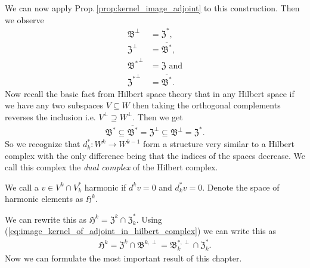 \documentclass[../master_thesis.tex]{subfiles}
\begin{document}
We can now apply Prop.\,\ref{prop:kernel_image_adjoint} to this construction. 
Then we observe 
\begin{align*}
    \mathfrak{B}^\perp &= \mathfrak{Z}^*,
    \\ \mathfrak{Z}^\perp &= \overline{\mathfrak{B}^*},
    \\ \mathfrak{B^*}^\perp &= \mathfrak{Z} \text{ and}
    \\ \mathfrak{Z^*}^\perp &= \overline{\mathfrak{B}^*}.
\end{align*}
Now recall the basic fact from Hilbert space theory that 
in any Hilbert space if we have any two subspaces $V \subseteq W$ then taking the 
orthogonal complements reverses the inclusion i.e.
$V^\perp \supseteq W^\perp$. Then we get 
\begin{align}
    \mathfrak{B}^* \subseteq \overline{\mathfrak{B}^*} 
    = \mathfrak{Z}^\perp  \subseteq \mathfrak{B}^\perp 
    = \mathfrak{Z}^*. \label{eq:image_kernel_of_adjoint_in_hilbert_complex}
\end{align}
So we recognize that $d_k^*:W^k \rightarrow W^{k-1}$ form a structure 
very similar to a Hilbert complex with the only difference being that 
the indices of the spaces decrease. We call this complex the 
\textit{dual complex} of the Hilbert complex.

\begin{definition}
    We call a $v \in V^k \cap V^*_k$ harmonic if $d^k v = 0$ and 
    $d^*_k v = 0$. Denote the space of harmonic elements as 
    $\mathfrak{H}^k$.
\end{definition}
\noindent We can rewrite this as $\mathfrak{H}^k = \mathfrak{Z}^k 
\cap \mathfrak{Z}^*_k$. Using 
(\ref{eq:image_kernel_of_adjoint_in_hilbert_complex}) we can write this as
\begin{align*}
    \mathfrak{H}^k = \mathfrak{Z}^k \cap \mathfrak{B}^{k,\perp}
         = \mathfrak{B}_k^{*,\perp} \cap \mathfrak{Z}^*_k.
\end{align*}
Now we can formulate the most important 
result of this chapter. 
\end{document}
